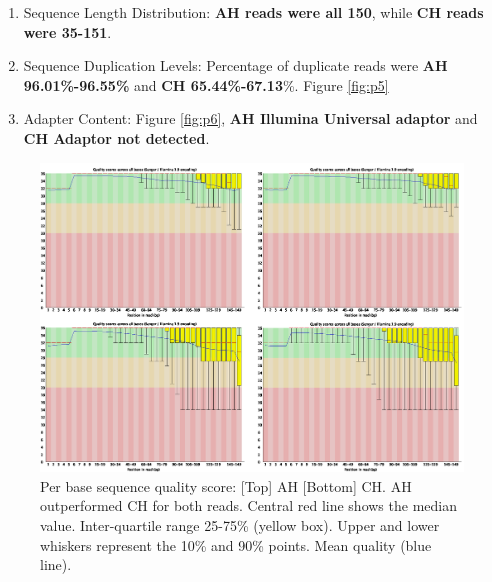 \documentclass{article}
\begin{document}
\begin{enumerate}
\item Sequence Length Distribution:\textbf{ AH reads were all 150}, while \textbf{CH reads were 35-151}.
 
\item Sequence Duplication Levels: Percentage of duplicate reads were \textbf{AH 96.01\%-96.55\%} and \textbf{CH 65.44\%-67.13}\%. Figure \ref{fig:p5}

\item Adapter Content: Figure \ref{fig:p6},
	\textbf{AH Illumina Universal adaptor} and
	\textbf{CH Adaptor not detected}.
\end{enumerate}

\begin{figure}[h] \hspace*{0cm} 
\begin{center}
    \includegraphics[scale=0.3]{fastqc/p1}
	\caption{Per base sequence quality score: [Top] AH [Bottom] CH. AH outperformed CH for both reads.
		Central red line shows the median value.
	Inter-quartile range 25-75\% (yellow box).
	Upper and lower whiskers represent the 10\% and 90\% points.
	Mean quality (blue line).
	}
	\label{fig:p1}
\end{center}
\end{figure}
\end{document}
